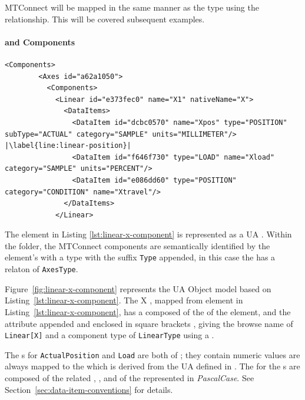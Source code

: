 MTConnect  will be mapped in the same manner as the type using the  relationship. This will be covered subsequent examples.

\FloatBarrier

\paragraph{ and  Components}

\begin{lstlisting}[firstnumber=last,escapechar=|,%
    caption={Components and Conditions},label={lst:linear-x-component}]
      <Components>
        <Axes id="a62a1050">
          <Components>
            <Linear id="e373fec0" name="X1" nativeName="X">
              <DataItems>
                <DataItem id="dcbc0570" name="Xpos" type="POSITION" subType="ACTUAL" category="SAMPLE" units="MILLIMETER"/> |\label{line:linear-position}|
                <DataItem id="f646f730" type="LOAD" name="Xload" category="SAMPLE" units="PERCENT"/>
                <DataItem id="e086dd60" type="POSITION" category="CONDITION" name="Xtravel"/>
              </DataItems>
            </Linear>
\end{lstlisting}

The  element in Listing \ref{lst:linear-x-component} is represented as a UA . Within the folder, the MTConnect components are semantically identified by the element's  with a type with the suffix \texttt{Type} appended, in this case the    has a  relaton of \texttt{AxesType}. 



Figure~\ref{fig:linear-x-component} represents the UA Object model based on  Listing~\ref{lst:linear-x-component}. The  X , mapped from  element in Listing~\ref{lst:linear-x-component}, has a  composed of the  of the element, and the  attribute appended and enclosed in square brackets \element{[X]}, giving the browse name of \texttt{Linear[X]} and a component type of \texttt{LinearType} using a  .

The s for \texttt{ActualPosition} and \texttt{Load} are both of  ; they contain numeric values are always mapped to the  which is derived from the UA  defined in \cite{UAPart8}. The  for the s are composed of the related  , , and  of the  represented in \textit{PascalCase}. See Section~\ref{sec:data-item-conventions} for details.

